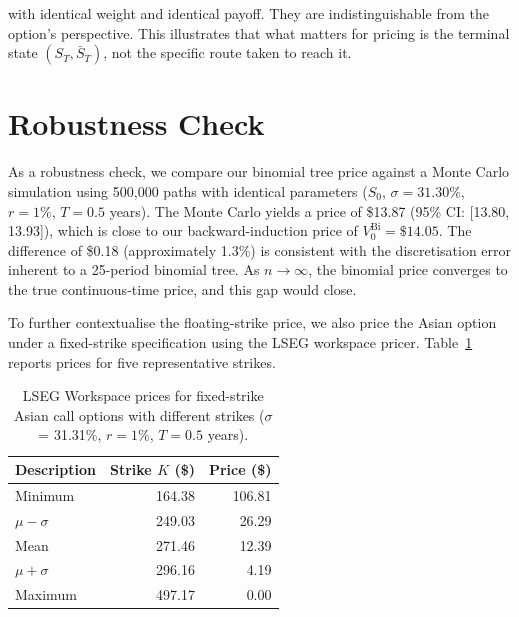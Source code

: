 \documentclass[hidelinks, 12pt, a4paper]{article}
\theoremstyle{definition}
\begin{document}
\noindent with identical weight and identical payoff. They are
indistinguishable from the option's perspective. This illustrates that
what matters for pricing is the terminal state $(S_T, \bar{S}_T)$, not
the specific route taken to reach it.


\newpage





\section{Robustness Check}
\label{sec:robustness}

As a robustness check, we compare our binomial tree price against a Monte Carlo
simulation using 500{,}000 paths with identical parameters
($S_0$, $\sigma = 31.30\%$, $r = 1\%$, $T = 0.5$ years).
The Monte Carlo yields a price of \$13.87 (95\% CI: [13.80,\,13.93]),
which is close to our backward-induction price of $V_0^{\mathrm{Bi}} = \$14.05$.
The difference of \$0.18 (approximately 1.3\%) is consistent with the
discretisation error inherent to a 25-period binomial tree.
As $n \to \infty$, the binomial price converges to the true continuous-time price,
and this gap would close. 

To further contextualise the floating-strike price, we also price the Asian option
under a fixed-strike specification using the LSEG workspace pricer.
Table~\ref{tab:fixed_strike} reports prices for five representative strikes.
\begin{table}[H]
  \centering
  \caption{LSEG Workspace prices for fixed-strike Asian call options with different strikes ($\sigma$ = 31.31\%, $r=1\%$, $T=0.5$ years).}
\label{tab:fixed_strike}

  \small
  \setlength{\tabcolsep}{6pt}
  \renewcommand{\arraystretch}{1.15}

  \begin{tabular}{lrr}
    \toprule
    \textbf{Description} & \textbf{Strike} $K$ (\$) & \textbf{Price} (\$) \\
    \midrule
    Minimum          & 164.38 & 106.81 \\
    $\mu - \sigma$   & 249.03 & 26.29 \\
    Mean             & 271.46 & 12.39 \\
    $\mu + \sigma$   & 296.16 & 4.19 \\
    Maximum          & 497.17 & 0.00 \\
    \bottomrule
  \end{tabular}
\end{table}
\end{document}
